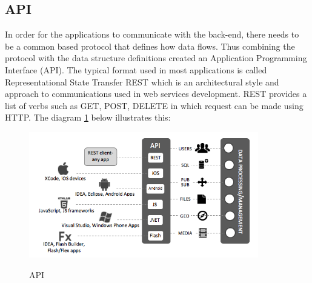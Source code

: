 \subsection{API}

In order for the applications to communicate with the back-end, there needs to be a common based protocol that defines how data flows. Thus combining the protocol with the data structure definitions created an Application Programming Interface (API). The typical format used in most applications is called  Representational State Transfer REST which is an architectural style and approach to communications used in web services development. REST provides a list of verbs such as GET, POST, DELETE in which request can be made using HTTP. The diagram \ref{fig:api} below illustrates this: 

\begin{figure}[!h]
    \caption{API}
    \centering
    \includegraphics[width=100mm]{images/baas-apis}
    \label{fig:api}
\end{figure}


